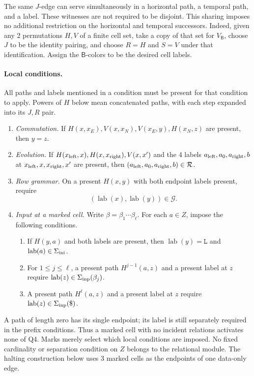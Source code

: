\documentclass[10pt]{article}
\numberwithin{equation}{section}
\theoremstyle{definition}
\begin{document}
The same $J$-edge can serve simultaneously in a horizontal path, a temporal path, and a label. These witnesses are not required to be disjoint. This sharing imposes no additional restriction on the horizontal and temporal successors. Indeed, given any 2 permutations $H,V$ of a finite cell set, take a copy of that set for $V_{\mathsf B}$, choose $J$ to be the identity pairing, and choose $R=H$ and $S=V$ under that identification. Assign the $\mathsf B$-colors to be the desired cell labels.

\paragraph{Local conditions.}

All paths and labels mentioned in a condition must be present for that condition to apply. Powers of $H$ below mean concatenated paths, with each step expanded into its $J,R$ pair.
\begin{enumerate}
\item[(Q1)] \emph{Commutation.} If
$H(x,x_E),V(x,x_N),V(x_E,y),H(x_N,z)$ are present, then $y=z$.
\item[(Q2)] \emph{Evolution.} If $H(x_{\rm left},x),H(x,x_{\rm right}),V(x,x')$
and the 4 labels $a_{\rm left},a_0,a_{\rm right},b$ at $x_{\rm left},x,x_{\rm right},x'$ are present, then $(a_{\rm left},a_0,a_{\rm right},b)\in\mathcal R$.
\item[(Q3)] \emph{Row grammar.} On a present $H(x,y)$ with both
endpoint labels present, require
\[
 (\operatorname{lab}(x),\operatorname{lab}(y))\in\mathcal G.
\]
\item[(Q4)] \emph{Input at a marked cell.} Write
$\beta=\beta_1\cdots\beta_\ell$. For each $a\in Z$, impose the following conditions.
\begin{enumerate}
\item If $H(y,a)$ and both labels are present, then
$\operatorname{lab}(y)=\mathtt L$ and $\operatorname{lab}(a)\in\Sigma_{\rm ini}$.
\item For $1\le j\le\ell$, a present path $H^{j-1}(a,z)$
and a present label at $z$ require $\operatorname{lab}(z)\in\Sigma_{\rm inp}(\beta_j)$.
\item A present path $H^\ell(a,z)$ and a present label at $z$
require $\operatorname{lab}(z)\in\Sigma_{\rm inp}(\mathtt{\$})$.
\end{enumerate}
\end{enumerate}
A path of length zero has its single endpoint; its label is still separately required in the prefix conditions. Thus a marked cell with no incident relations activates none of Q4. Marks merely select which local conditions are imposed. No fixed cardinality or separation condition on $Z$ belongs to the relational module. The halting construction below uses 3 marked cells as the endpoints of one data-only edge.
\end{document}
